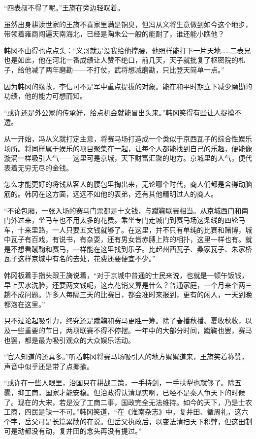 “四表叔不得了呢。”王旖在旁边轻叹着。

虽然出身耕读世家的王旖不喜家里满是铜臭，但冯从义将生意做到如今这个地步，带领着雍商闯遍天南海北，已经是陶朱公一般的能耐了，谁还能小瞧他？

韩冈不由得也点点头：“义哥就是没我给他撑腰，他照样能打下一片天地……二表兄也是如此，他在河北一番成绩让人赞不绝口，前几天，天子就批复了枢密院的札子，给他减了两年磨勘——不打仗，武将想减磨勘，只比登天简单一点。”

因为韩冈的缘故，李信可不是军中重点提拔的对象。能在和平时期立下减少磨勘的功绩，他的能力可想而知。

“或许还是外公家的传承好，给点机会就能冒出头来。”韩冈笑得有些让人捉摸不透。

从一开始，冯从义就打定主意，将赛马场打造成一个类似于京西瓦子的综合性娱乐场所。将同样属于娱乐的项目聚集在一起，让每个人都能找到自己的乐趣，便能像漩涡一样吸引人气——这里可是京城，天下财富汇聚的地方。京城里的人气，便代表着无穷无尽的金钱。

怎么才能更好的将钱从客人的腰包里掏出来，无论哪个时代，商人们都是舍得动脑筋的。韩冈在这方面，远远不如他的表弟，还有其他精明过人的商人。

“不论包厢，一张入场的赛马门票都是十文钱，与蹴鞠联赛相当。从京城西门和南门外过来，坐马车也不用太多的花费。乘坐专门走城门到赛马场这条线的四轮马车，十来里路，一人只要五文钱就够了。在这里，并不只有单纯的比赛和赌博，城中瓦子有百戏，有说书，有杂耍，还有男女皆赤膊上阵的相扑，这里一样也有。就是不想看蹴鞠和赛马，一样能在这里找到乐子。比起州西瓦子、桑家瓦子、朱家桥瓦子这样京城中有名的去处，花费还要便宜不少。”

韩冈板着手指头跟王旖说着，“对于京城中普通的士民来说，也就是一顿午饭钱，早上买水洗脸，还要两文钱呢，这点花销又算是什么？普通家庭，一个月来个两三趟不成问题。许多人每隔三天的比赛日，都会准时来报到，更有的闲人，一天到晚都泡在这里。”

只不过论起吸引力，终究还是蹴鞠和赛马更胜一筹。除了春播秋播、夏收秋收，以及一些重要的节日，两项联赛不得不停摆。一年中的大部分时间，蹴鞠也罢，赛马也罢，都是最为吸引观众的大众娱乐活动。

“官人知道的还真多。”听着韩冈将赛马场吸引人的地方娓娓道来，王旖笑着称赞，声音中似乎还是带了点揶揄。

“或许在一些人眼里，治国只在耕战二策，一手持剑，一手扶犁也就够了。除五蠹，抑工商，国家才能安稳。但治政得认清现实啊，已经不是秦人争天下的时候了。现在的大宋，若是没了工商二事，国政完全无法维持。如今的天下，乃是士农工商，四民是缺一不可。”韩冈笑道，“在《淮南杂志》中，复井田、循周礼，这六个字，岳父可是长篇累牍的在说。但岳父执政后，以变法清扫天下积弊，但这田制可是动都没有动，复井田的念头再没有提过。”

